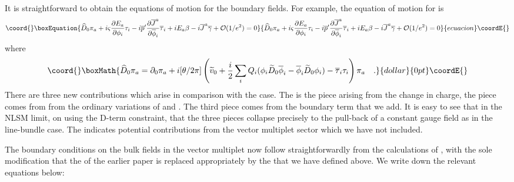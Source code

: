 \documentclass[a4paper,12pt]{article}
\begin{document}
It is straightforward to obtain the equations of motion for the
boundary fields. For example, the equation of motion for \coordHE{}
is
\begin{equation}\coord{}\boxEquation{
\widehat{D}_0 \pi_a + i
\varsigma{{\partial E_a}\over{\partial\phi_i}} \tau_i
-i \overline{p}'{{\partial
\overline{J}^a}\over{\partial\overline{\phi}_i}}
\overline{\tau}_i+iE_a \beta
-i \overline{J}^a \overline{\gamma} +{\cal O}(1/e^2)=0
}{
\widehat{D}_0 \pi_a + i
\varsigma{{\partial E_a}\over{\partial\phi_i}} \tau_i
-i \overline{p}'{{\partial
\overline{J}^a}\over{\partial\overline{\phi}_i}}
\overline{\tau}_i+iE_a \beta
-i \overline{J}^a \overline{\gamma} +{\cal O}(1/e^2)=0
}{ecuacion}\coordE{}\end{equation}
where 
$$\coord{}\boxMath{
\widehat{D}_0 \pi_a = \partial_0 \pi_a + i [\theta/2\pi]
\left(\widetilde{v}_0 + {i\over 2}\sum_i Q_i(\phi_i
\widetilde{D}_0\overline{\phi}_i - \overline{\phi}_i
\widetilde{D}_0 \phi_i) - \overline{\tau}_i\tau_i \right) \pi_a \quad.
}{dollar}{0pt}\coordE{}$$
There are three new contributions which arise in comparison with the
\coordHE{} case. The \coordHE{} is the piece arising from
the change in charge, the \coordHE{} piece comes from
from the ordinary variations of \myHighlight{$\delta\xi$}\coordHE{} and \myHighlight{$\delta\overline{\xi}$}\coordHE{}.
The third piece comes from the boundary term that we add. It is easy to
see that in the NLSM limit, on using the D-term constraint, that the
three pieces collapse precisely to the pull-back of a constant gauge
field as in the line-bundle case\cite{HIV}. The \coordHE{}
indicates potential contributions from the vector multiplet sector  which we
have not included.

The boundary conditions on the bulk fields in the vector multiplet
now follow straightforwardly
from the calculations of \cite{lsmone}, with the sole modification that
the \myHighlight{$\theta$}\coordHE{} of the earlier paper is replaced appropriately by the
\myHighlight{$\Theta$}\coordHE{} that we have defined above. We write down the relevant
equations below:
\end{document}

